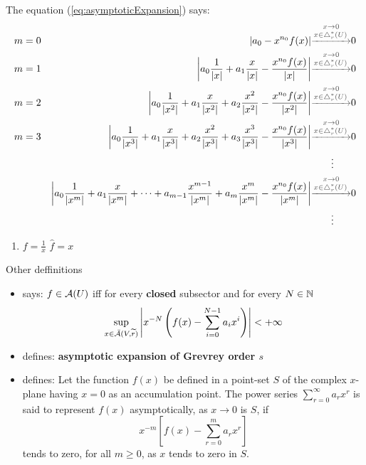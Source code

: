 \begin{frame}
  The equation (\ref{eq:asymptoticExpansion}) says:
  \newcommand{\myto}{\textcolor{gray!60!black}{\overset{x\to0}{\xrightarrow{x\in\triangle_r^*(U)}}}}
  \begin{align*}
    m&=0&
    \left|a_{0}-x^{n_{0}}f(x)\right| &\myto 0
  \\ m&=1&
    \left|a_{0}\frac{1}{\left|x\right|}+a_{1}\frac{x}{\left|x\right|}
    -\frac{x^{n_{0}}f(x)}{\left|x\right|} \right|&\myto 0
  \\ m&=2&
    \left|a_{0}\frac{1}{\left|x^{2}\right|}+a_{1}\frac{x}{\left|x^2\right|}
    +a_{2}\frac{x^2}{\left|x^2\right|}
    -\frac{x^{n_{0}}f(x)}{\left|x^{2}\right|}\right| &\myto 0
  \\ m&=3&
    \left|a_{0}\frac{1}{\left|x^{3}\right|}
    +a_{1}\frac{x}{\left|x^{3}\right|}
    +a_{2}\frac{x^2}{\left|x^3\right|}
    +a_{3}\frac{x^3}{\left|x^3\right|}
    -\frac{x^{n_{0}}f(x)}{\left|x^{3}\right|} \right|&\myto 0
  \\&&&\qquad\vdots
  \\ &&
    \left|a_{0}\frac{1}{\left|x^{m}\right|}
    +a_{1}\frac{x}{\left|x^{m}\right|}+\dots
    +a_{m-1}\frac{x^{m-1}}{\left|x^m\right|}
    +a_{m}\frac{x^{m}}{\left|x^m\right|}
    -\frac{x^{n_{0}}f(x)}{\left|x^{m}\right|} \right|&\myto 0
  \\&&&\qquad\vdots
  \end{align*}
  \begin{exmp}
    \begin{enumerate}
      \item $f=\frac{1}{x}$ \Rightarrow{} $\hat f=x$
        \textcolor{red}{\lightning}
    \end{enumerate}
  \end{exmp}
\end{frame}

\begin{frame}{Other deffinitions}
  \begin{itemize}
    \item \cite[2]{majima1984asymptotic} says:
      $f\in\mathcal{A}(U)$ iff for every \textbf{closed} subsector and for every
      $N\in\mathbb{N}$
      \[
        \sup_{x\in\bar{\mathcal{A}}(V,\widetilde r)}
          \left|x^{-N}\left(f(x)-\sum_{i=0}^{N-1}a_ix^i\right)\right|
        <+\infty
      \]
    \item \cite{zbMATH00060600} defines:
      \textbf{asymptotic expansion of Grevrey order $s$}
    \item \cite{wasow2002asymptotic} defines:
      Let the function $f(x)$ be defined in a point-set $S$ of the complex
      $x$-plane having $x=0$ as an accumulation point. The power series
      $\sum_{r=0}^\infty a_rx^r$ is said to represent $f(x)$ asymptotically, as
      $x\to0$ is $S$, if
      \[
        x^{-m}\left[f(x)-\sum_{r=0}^ma_rx^r\right]
      \]
      tends to zero, for all $m\geq0$, as $x$ tends to zero in $S$.
  \end{itemize}
\end{frame}

